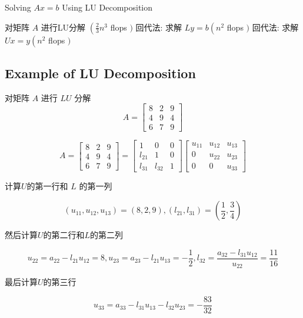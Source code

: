\begin{algorithm}[htbp]
    \caption{Solving $Ax = b$ Using LU Decomposition}
    对矩阵 $ A $ 进行LU分解 $ \left(\frac{2}{3} n^{3}\right. $ flops $ ) $\;
    回代法: 求解 $ L y=b\left(n^{2}\right. $ flops $ ) $\;
    回代法: 求解 $ U x=y\left(n^{2}\right. $ flops $ ) $\;
\end{algorithm}


\subsection{Example of LU Decomposition}

\begin{example}
    对矩阵 $ A $ 进行 $ L U $ 分解
    \begin{equation}
        A=\left[\begin{array}{lll}
                8 & 2 & 9 \\
                4 & 9 & 4 \\
                6 & 7 & 9
            \end{array}\right]
    \end{equation}


    \begin{equation} A=\left[\begin{array}{lll}8 & 2 & 9 \\ 4 & 9 & 4 \\ 6 & 7 & 9\end{array}\right]=\left[\begin{array}{ccc}1 & 0 & 0 \\ l_{21} & 1 & 0 \\ l_{31} & l_{32} & 1\end{array}\right]\left[\begin{array}{ccc}u_{11} & u_{12} & u_{13} \\ 0 & u_{22} & u_{23} \\ 0 & 0 & u_{33}\end{array}\right] \end{equation}

    计算$U$的第一行和 $ L $ 的第一列

    \begin{equation} \left(u_{11}, u_{12}, u_{13}\right)=(8,2,9) , \left(l_{21}, l_{31}\right)=\left(\frac{1}{2}, \frac{3}{4}\right) \end{equation}

    然后计算$U$的第二行和$L$的第二列

    \begin{equation} u_{22}=a_{22}-l_{21} u_{12}=8 ,
        u_{23}=a_{23}-l_{21} u_{13}=-\frac{1}{2} , l_{32}=\frac{a_{32}-l_{31} u_{12}}{u_{22}}=\frac{11}{16} \end{equation}


    最后计算$U$的第三行

    \begin{equation} u_{33}=a_{33}-l_{31}  u_{13}-l_{32} u_{23}=-\frac{83}{32} \end{equation}

\end{example}

